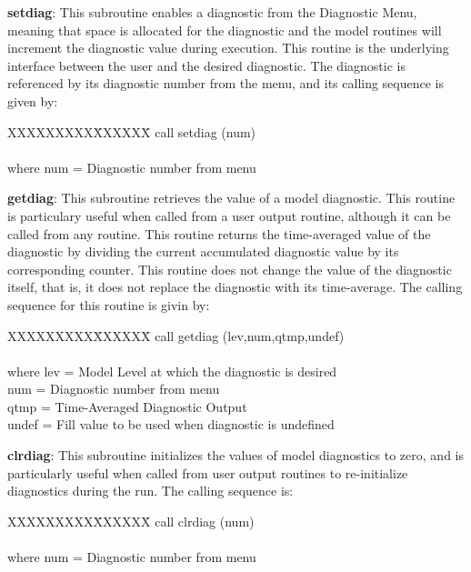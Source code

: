 \noindent
{\bf setdiag}:  This subroutine enables a diagnostic from the Diagnostic Menu, meaning 
that space is allocated for the diagnostic and the model routines will increment the 
diagnostic value during execution.  This routine is the underlying interface
between the user and the desired diagnostic.  The diagnostic is referenced by its diagnostic
number from the menu, and its calling sequence is given by:

\noindent
\begin{tabbing}
XXXXXXXXX\=XXXXXX\= \kill
\>        call setdiag (num) \\
\\
where \>  num   \>= Diagnostic number from menu \\
\end{tabbing}

\noindent
{\bf getdiag}:  This subroutine retrieves the value of a model diagnostic.  This routine 
is particulary useful when called from a user output routine, although it can be called 
from any routine.  This routine returns the time-averaged value of the diagnostic by
dividing the current accumulated diagnostic value by its corresponding counter.  This 
routine does not change the value of the diagnostic itself, that is, it does not replace 
the diagnostic with its time-average.  The calling sequence for this routine is givin by:

\noindent
\begin{tabbing}
XXXXXXXXX\=XXXXXX\= \kill
\>        call getdiag (lev,num,qtmp,undef) \\
\\
where \>  lev   \>= Model Level at which the diagnostic is desired \\
      \>  num   \>= Diagnostic number from menu \\
      \>  qtmp  \>= Time-Averaged Diagnostic Output \\
      \>  undef \>= Fill value to be used when diagnostic is undefined \\
\end{tabbing}

\noindent
{\bf clrdiag}:  This subroutine initializes the values of model diagnostics to zero, and is
particularly useful when called from user output routines to re-initialize diagnostics 
during the run.  The calling sequence is:

\noindent
\begin{tabbing}
XXXXXXXXX\=XXXXXX\= \kill
\>        call clrdiag (num) \\
\\
where \>  num   \>= Diagnostic number from menu \\
\end{tabbing}

